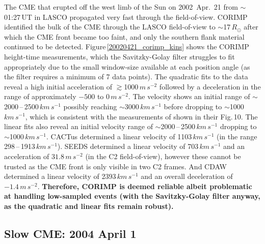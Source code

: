 \documentclass[referee,a4paper,12pt,traditabstract]{swsc}
\begin{document}
\begin{linenumbers}
The CME that erupted off the west limb of the Sun on 2002~Apr.~21 from $\sim$01:27\,UT in LASCO propagated very fast through the field-of-view. CORIMP identified the bulk of the CME through the LASCO field-of-view to $\sim$17\,$R_\odot$ after which the CME front became too faint, and only the southern flank material continued to be detected. Figure\,\ref{20020421_corimp_kins} shows the CORIMP height-time measurements, which the Savitzky-Golay filter struggles to fit appropriately due to the small window-size available at each position angle (as the filter requires a minimum of 7 data points). The quadratic fits to the data reveal a high initial acceleration of $\gtrsim$1000\,$m\,s^{-2}$ followed by a deceleration in the range of approximately $-500$ to $0\,m\,s^{-2}$. The velocity shows an initial range of $\sim$2000\,--\,2500\,$km\,s^{-1}$ possibly reaching $\sim$3000\,$km\,s^{-1}$ before dropping to $\sim$1000\,$km\,s^{-1}$, which is consistent with the measurements of \cite{2009A&A...495..325B} shown in their Fig.\,10. The linear fits also reveal an initial velocity range of $\sim$2000\,--\,2500\,$km\,s^{-1}$ dropping to $\sim$1000\,$km\,s^{-1}$. CACTus determined a linear velocity of 1103$\,km\,s^{-1}$ (in the range 298\,--\,1913\,$km\,s^{-1}$). SEEDS determined a linear velocity of 703\,$km\,s^{-1}$ and an acceleration of $31.8\,m\,s^{-2}$ (in the C2 field-of-view), however these cannot be trusted as the CME front is only visible in two C2 frames. And CDAW determined a linear velocity of 2393$\,km\,s^{-1}$ and an overall deceleration of $-1.4\,m\,s^{-2}$. {\bf Therefore, CORIMP is deemed reliable albeit problematic at handling low-sampled events (with the Savitzky-Golay filter anyway, as the quadratic and linear fits remain robust).}


\subsection{Slow CME: 2004 April 1}



\end{linenumbers}
\end{document}
